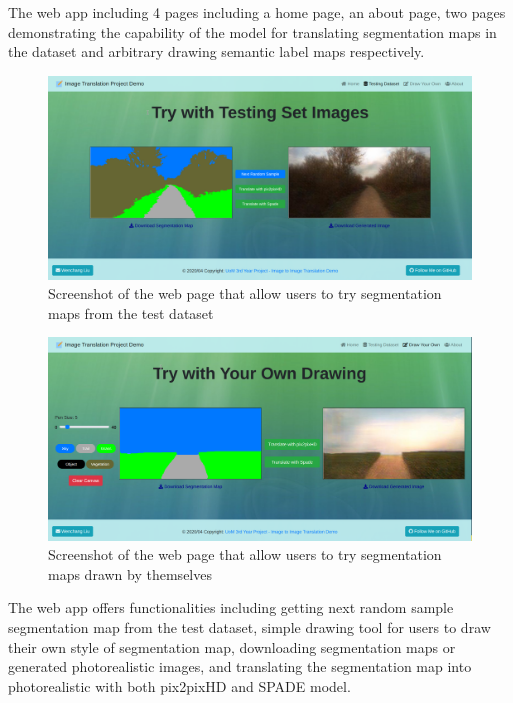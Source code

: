 The web app including 4 pages including a home page, an about page, two pages demonstrating
the capability of the model for translating segmentation maps in the dataset and arbitrary 
drawing semantic label maps respectively. 

\begin{figure}[H]
    \begin{center}
    \includegraphics[width=14cm]{figures/GUI-testset}
    \end{center}
    \caption{Screenshot of the web page that allow users to try segmentation maps from the test dataset}
    \label{fig:GUI-testset}
\end{figure}

\begin{figure}[H]
    \begin{center}
    \includegraphics[width=14cm]{figures/GUI-draw}
    \end{center}
    \caption{Screenshot of the web page that allow users to try segmentation maps drawn by themselves}
    \label{fig:GUI-draw}
\end{figure}

The web app offers functionalities including getting next random sample segmentation map from 
the test dataset, simple drawing tool for users to draw their own style of segmentation map, 
downloading segmentation maps or generated photorealistic images, and translating the segmentation
map into photorealistic with both pix2pixHD and SPADE model.



